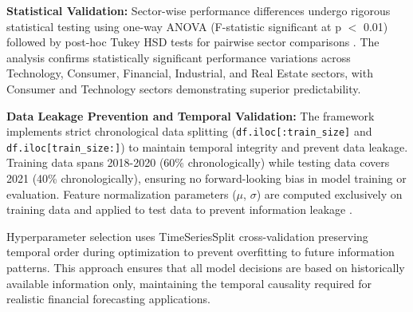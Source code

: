 \documentclass[3p,times,procedia]{elsarticle}
\begin{document}
\begin{table}[!ht]
\centering
\caption{\textbf{Sector-wise Average Performance Metrics}}
\end{table}

\textbf{Statistical Validation:} Sector-wise performance differences undergo rigorous statistical testing using one-way ANOVA (F-statistic significant at p $<$ 0.01) followed by post-hoc Tukey HSD tests for pairwise sector comparisons \cite{Box1970,Tukey1949}. The analysis confirms statistically significant performance variations across Technology, Consumer, Financial, Industrial, and Real Estate sectors, with Consumer and Technology sectors demonstrating superior predictability.

\textbf{Data Leakage Prevention and Temporal Validation:} The framework implements strict chronological data splitting (\texttt{df.iloc[:train\_size]} and \texttt{df.iloc[train\_size:]}) to maintain temporal integrity and prevent data leakage. Training data spans 2018-2020 (60\% chronologically) while testing data covers 2021 (40\% chronologically), ensuring no forward-looking bias in model training or evaluation. Feature normalization parameters ($\mu$, $\sigma$) are computed exclusively on training data and applied to test data to prevent information leakage \cite{Fischer2018}.

Hyperparameter selection uses TimeSeriesSplit cross-validation preserving temporal order during optimization to prevent overfitting to future information patterns. This approach ensures that all model decisions are based on historically available information only, maintaining the temporal causality required for realistic financial forecasting applications.
\end{document}
